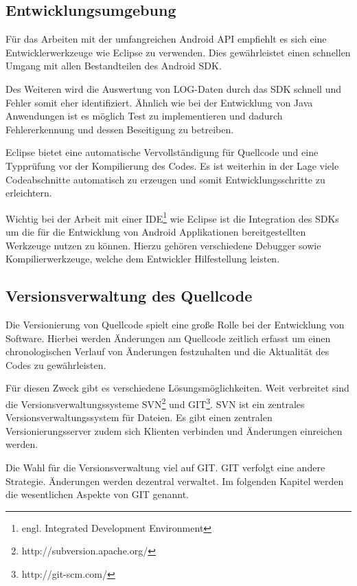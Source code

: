 \subsection{Entwicklungsumgebung}

Für das Arbeiten mit der umfangreichen Android API empfiehlt es sich eine Entwicklerwerkzeuge wie Eclipse zu verwenden. Dies gewährleistet einen schnellen Umgang mit allen Bestandteilen des Android SDK.

Des Weiteren wird die Auswertung von LOG-Daten durch das SDK schnell und Fehler somit eher identifiziert. Ähnlich wie bei der Entwicklung von Java Anwendungen ist es möglich Test zu implementieren und dadurch Fehlererkennung und dessen Beseitigung zu betreiben.

Eclipse bietet eine automatische Vervollständigung für Quellcode und eine Typprüfung vor der Kompilierung des Codes. Es ist weiterhin in der Lage viele Codeabschnitte automatisch zu erzeugen und somit Entwicklungsschritte zu erleichtern.

Wichtig bei der Arbeit mit einer IDE\footnote{engl. Integrated Development Environment} wie Eclipse ist die Integration des SDKs um die für die Entwicklung von Android Applikationen bereitgestellten Werkzeuge nutzen zu können. Hierzu gehören verschiedene Debugger sowie Kompilierwerkzeuge, welche dem Entwickler Hilfestellung leisten.

\subsection{Versionsverwaltung des Quellcode}

Die Versionierung von Quellcode spielt eine große Rolle bei der Entwicklung von Software. Hierbei werden Änderungen am Quellcode zeitlich erfasst um einen chronologischen Verlauf von Änderungen festzuhalten und die Aktualität des Codes zu gewährleisten.

Für diesen Zweck gibt es verschiedene Lösungsmöglichkeiten. Weit verbreitet sind die Versionsverwaltungssysteme SVN\footnote{http://subversion.apache.org/} und GIT\footnote{http://git-scm.com/}.
SVN ist ein zentrales Versionsverwaltungssystem für Dateien. Es gibt einen zentralen Versionierungsserver zudem sich Klienten verbinden und Änderungen einreichen werden.

Die Wahl für die Versionsverwaltung viel auf GIT. GIT verfolgt eine andere Strategie. Änderungen werden dezentral verwaltet. Im folgenden Kapitel werden die wesentlichen Aspekte von GIT genannt.

